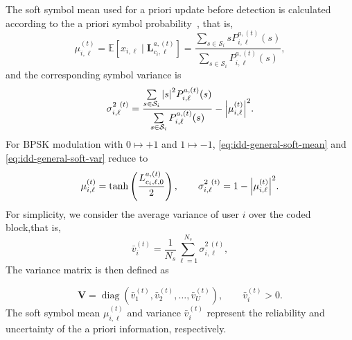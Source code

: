 The soft symbol mean used for a priori update before detection is calculated according to the a priori symbol probability~\cite{shapiro2005soft}, that is, 
\begin{equation}
    \mu^{(t)}_{i,\ell}
    =
    \mathbb{E}[x_{i,\ell}\mid \bm{L}^{a,(t)}_{c_{i},\ell}]
    =
    \frac{
    \sum\limits_{s\in\mathcal{S}_i}
    s P^{a,(t)}_{i,\ell}(s)}
    {\sum\limits_{s\in\mathcal{S}_i}
    P^{a,(t)}_{i,\ell}(s)} ,
    \label{eq:idd-general-soft-mean}
\end{equation}
and the corresponding symbol variance is
\begin{equation}
    \sigma^{2~(t)}_{i,\ell}
    =
    \frac{
    \sum\limits_{s\in\mathcal{S}_i}
    \abs{s}^2 P^{a,(t)}_{i,\ell}(s)}
    {\sum\limits_{s\in\mathcal{S}_i}
    P^{a,(t)}_{i,\ell}(s)}
    -
    \abs{\mu^{(t)}_{i,\ell}}^2 .
    \label{eq:idd-general-soft-var}
\end{equation}
For BPSK modulation with $0\mapsto +1$ and $1\mapsto -1$, \eqref{eq:idd-general-soft-mean} and \eqref{eq:idd-general-soft-var} reduce to
\begin{equation}
    \mu^{(t)}_{i,\ell}
    =
    \tanh\left(\frac{L^{a,(t)}_{c_{i},\ell,0}}{2}\right),
    \qquad
    \sigma^{2~(t)}_{i,\ell}
    =
    1-\abs{\mu^{(t)}_{i,\ell}}^2 .
\end{equation}
For simplicity, we consider the average variance of user $i$ over the coded block,that is,
\begin{equation}
    \label{eq:average variance of user i}
    \bar{v}^{(t)}_{i}
    =
    \frac{1}{N_s}\sum_{\ell=1}^{N_s}\sigma^{2~(t)}_{i,\ell},
\end{equation}
The variance matrix is then defined as

\begin{equation}
    \bm{V}
    =
    \operatorname{diag}(\bar{v}_1^{(t)},\bar{v}_2^{(t)},\ldots,\bar{v}_U^{(t)}),
    \qquad
    \bar{v}_i^{(t)}>0.
    \label{eq:variance-matrix}
\end{equation}
The soft symbol mean $\mu^{(t)}_{i,\ell}$ and variance $\bar{v}^{(t)}_{i}$ represent the reliability and uncertainty of the a priori information, respectively.

